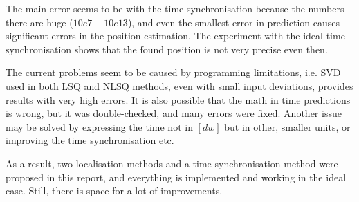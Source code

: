 \documentclass[journal]{IEEEtran}
\begin{document}
The main error seems to be with the time synchronisation because the numbers there are huge ($10e7 - 10e13$), and even the smallest error in prediction causes significant errors in the position estimation. 
The experiment with the ideal time synchronisation shows that the found position is not very precise even then.

The current problems seem to be caused by programming limitations, i.e. SVD used in both LSQ and NLSQ methods, even with small input deviations, provides results with very high errors.
It is also possible that the math in time predictions is wrong, but it was double-checked, and many errors were fixed. 
Another issue may be solved by expressing the time not in $[\si{dw}]$ but in other, smaller units, or improving the time synchronisation etc.

As a result, two localisation methods and a time synchronisation method were proposed in this report, and everything is implemented and working in the ideal case. 
Still, there is space for a lot of improvements.

{}

\cleardoublepage
\end{document}
